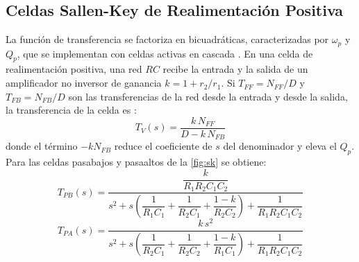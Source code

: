 \subsection{Celdas Sallen-Key de Realimentación Positiva}
\label{sec_2.3}
La función de transferencia se factoriza en bicuadráticas, caracterizadas por $\omega_p$ y $Q_p$, que se implementan con celdas activas en cascada \cite[sec.~7.2]{daryanani}. En una celda de realimentación positiva, una red $RC$ recibe la entrada y la salida de un amplificador no inversor de ganancia $k = 1 + r_2/r_1$. Si $T_{FF} = N_{FF}/D$ y $T_{FB} = N_{FB}/D$ son las transferencias de la red desde la entrada y desde la salida, la transferencia de la celda es \cite[sec.~7.4.2, ec.~7.18]{daryanani}:
\begin{equation}
    T_V(s) = \frac{k \, N_{FF}}{D - k \, N_{FB}}
    \label{eq:tv}
\end{equation}
donde el término $-k N_{FB}$ reduce el coeficiente de $s$ del denominador y eleva el $Q_p$. Para las celdas pasabajos y pasaaltos de la \autoref{fig:sk} \cite[secs.~8.2 y 8.3]{daryanani} se obtiene:
\begin{equation}
    T_{PB}(s) = \frac{\dfrac{k}{R_1 R_2 C_1 C_2}}{s^2 + s\left(\dfrac{1}{R_1 C_1} + \dfrac{1}{R_2 C_1} + \dfrac{1 - k}{R_2 C_2}\right) + \dfrac{1}{R_1 R_2 C_1 C_2}}
    \label{eq:sk_pb}
\end{equation}
\begin{equation}
    T_{PA}(s) = \frac{k \, s^2}{s^2 + s\left(\dfrac{1}{R_2 C_1} + \dfrac{1}{R_2 C_2} + \dfrac{1 - k}{R_1 C_1}\right) + \dfrac{1}{R_1 R_2 C_1 C_2}}
    \label{eq:sk_pa}
\end{equation}

